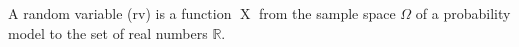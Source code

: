 A random variable (rv) is a function $\operatorname{X}$ from the sample space $\Omega$ of a probability model to the set of real numbers $\mathbb{R}$.
